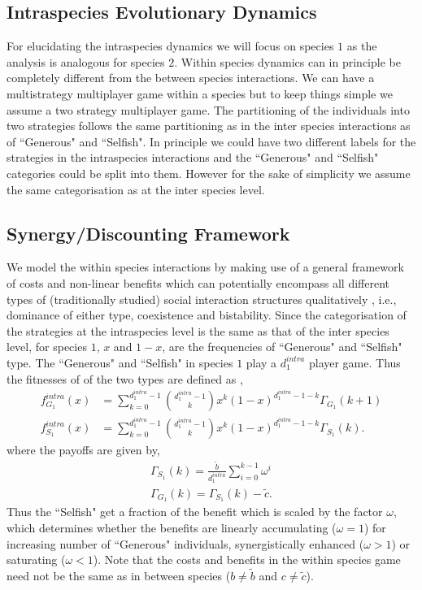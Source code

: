 \documentclass[12pt]{article}
\begin{document}
\begin{appendices}
\section{Intraspecies Evolutionary Dynamics}
\label{appB}

For elucidating the intraspecies dynamics we will focus on species $1$ as the analysis is analogous for species $2$.
Within species dynamics can in principle be completely different from the between species interactions. 
We can have a multistrategy multiplayer game within a species but to keep things simple we assume a two strategy multiplayer game.
The partitioning of the individuals into two strategies follows the same partitioning as in the inter species interactions as of ``Generous" and ``Selfish". 
In principle we could have two different labels for the strategies in the intraspecies interactions and the ``Generous" and ``Selfish" categories could be split into them.
However for the sake of simplicity we assume the same categorisation as at the inter species level.

\subsection*{Synergy/Discounting Framework}
We model the within species interactions by making use of a general framework of costs and non-linear benefits \citep{eshel:AmNat:1988,hauert:JTB:2006a} which can potentially encompass all different types of (traditionally studied) social interaction structures qualitatively \citep{nowak:book:2006}, i.e., dominance of either type, coexistence and bistability.
Since the categorisation of the strategies at the intraspecies level is the same as that of the inter species level, for species $1$, $x$ and $1-x$, are the frequencies of ``Generous" and ``Selfish" type. 
The ``Generous" and ``Selfish" in species $1$ play a $d_1^{intra}$ player game.
Thus the fitnesses of of the two types are defined as \citep{hauert:JTB:2006a},
%
\begin{align}
	f^{intra}_{G_1} (x) &= \sum_{k=0}^{d_1^{intra} -1} \binom{d_1^{intra} -1}{k}x^k (1-x)^{d_1^{intra} -1-k} \Gamma_{G_1}(k+1)  \\
	f^{intra}_{S_1} (x) &= \sum_{k=0}^{d_1^{intra} -1} \binom{d_1^{intra} -1}{k}x^k (1-x)^{d_1^{intra} -1-k} \Gamma_{S_1}(k).
\label{intrafiteqs}
\end{align}
%
where the payoffs are given by,
\begin{align}
	\Gamma_{S_1} (k) = \frac{\tilde{b}}{d_1^{intra}} \sum_{i=0}^{k-1} \omega^i  \\
	\Gamma_{G_1} (k) = \Gamma_{S_1} (k) - \tilde{c}.
\label{eqintragamepayoffs}
\end{align}
%
Thus the ``Selfish" get a fraction of the benefit which is scaled by the factor $\omega$, which determines whether the benefits are linearly accumulating ($\omega=1$) for increasing number of ``Generous" individuals, synergistically enhanced ($\omega>1$) or saturating ($\omega<1$).
Note that the costs and benefits in the within species game need not be the same as in between species ($b\neq \tilde{b}$ and $c \neq \tilde{c}$).



\end{appendices}
\end{document}
